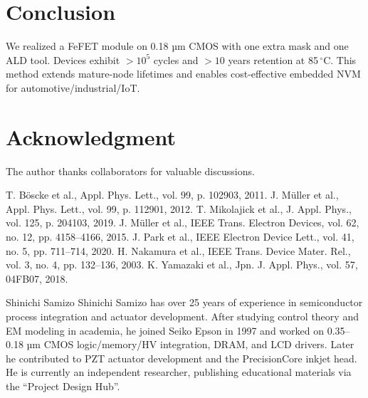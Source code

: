 \documentclass[conference]{IEEEtran}
\begin{document}
\section{Conclusion}
We realized a FeFET module on 0.18 µm CMOS with one extra mask and one ALD tool.  
Devices exhibit $>10^5$ cycles and $>10$ years retention at 85\,$^\circ$C.  
This method extends mature-node lifetimes and enables cost-effective embedded NVM for automotive/industrial/IoT.

\section*{Acknowledgment}
The author thanks collaborators for valuable discussions.


\begin{thebibliography}{99}
T. Böscke et al., Appl. Phys. Lett., vol. 99, p. 102903, 2011.  
J. Müller et al., Appl. Phys. Lett., vol. 99, p. 112901, 2012.  
T. Mikolajick et al., J. Appl. Phys., vol. 125, p. 204103, 2019.  
J. Müller et al., IEEE Trans. Electron Devices, vol. 62, no. 12, pp. 4158–4166, 2015.  
J. Park et al., IEEE Electron Device Lett., vol. 41, no. 5, pp. 711–714, 2020.  
H. Nakamura et al., IEEE Trans. Device Mater. Rel., vol. 3, no. 4, pp. 132–136, 2003.  
K. Yamazaki et al., Jpn. J. Appl. Phys., vol. 57, 04FB07, 2018.  
\end{thebibliography}

\begin{IEEEbiography}{Shinichi Samizo}
Shinichi Samizo has over 25 years of experience in semiconductor process integration and actuator development.  
After studying control theory and EM modeling in academia, he joined Seiko Epson in 1997 and worked on 0.35–0.18 µm CMOS logic/memory/HV integration, DRAM, and LCD drivers.  
Later he contributed to PZT actuator development and the PrecisionCore inkjet head.  
He is currently an independent researcher, publishing educational materials via the “Project Design Hub”.
\end{IEEEbiography}
\end{document}
